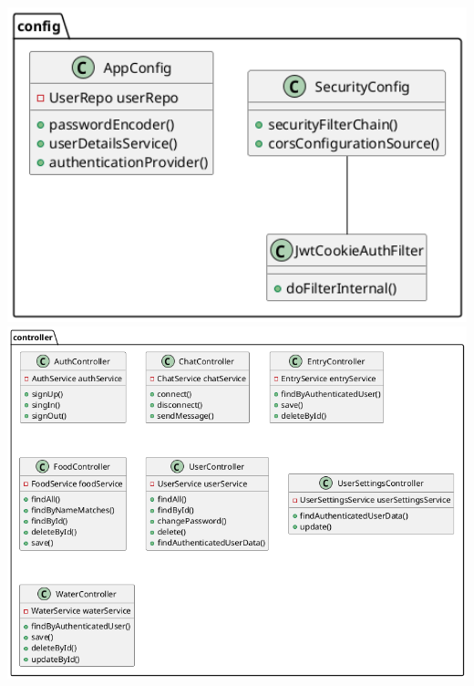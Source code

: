 \documentclass[a4paper,10pt]{article}
\begin{document}
            \includegraphics[width=1\textwidth]{class_config}
            \includegraphics[width=1\textwidth]{class_controller}
\end{document}

